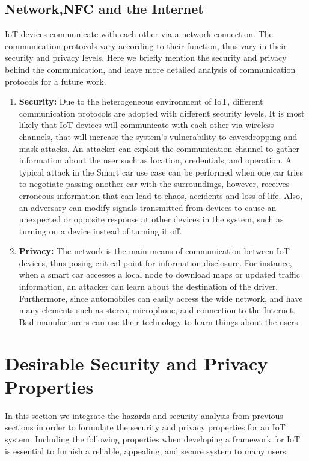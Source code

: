 \documentclass{llncs}
\begin{document}
\subsection{Network,NFC and the Internet} 
IoT devices communicate with each other via a network connection. The communication protocols vary according to their function, thus vary in their security and privacy levels. Here we briefly mention the security and privacy behind the communication, and leave more detailed analysis of communication protocols for a future work.
\begin{enumerate}
\item \textbf{Security:}
Due to the heterogeneous environment of IoT, different communication protocols are adopted with different security levels\cite{Hu2010}. It is most likely that IoT devices will communicate with each other via wireless channels, that will increase the system's vulnerability to eavesdropping and mask attacks\cite{Cha2009}. An attacker can exploit the communication channel to gather information about the user such as location, credentials, and operation. A typical attack in the Smart car use case can be performed when one car tries to negotiate passing another car with the surroundings, however, receives erroneous information that can lead to chaos, accidents and loss of life. Also, an adversary can modify signals transmitted from devices to cause an unexpected or opposite response at other devices in the system, such as turning on a device instead of turning it off. 

\item \textbf{Privacy:} 
The network is the main means of communication between IoT devices, thus posing critical point for information disclosure. For instance, when a smart car accesses a local node to download maps or updated traffic information, an attacker can learn about the destination of the driver. Furthermore, since automobiles can easily access the wide network, and have many elements such as stereo, microphone, and connection to the Internet. Bad manufacturers can use their technology to learn things about the users.  
\end{enumerate}


\section{Desirable Security and Privacy Properties}
In this section we integrate the hazards and security analysis from previous sections in order to formulate the security and privacy properties for an IoT system. Including the following properties when developing a framework for IoT is essential to furnish a reliable, appealing, and secure system to many users.
\end{document}
